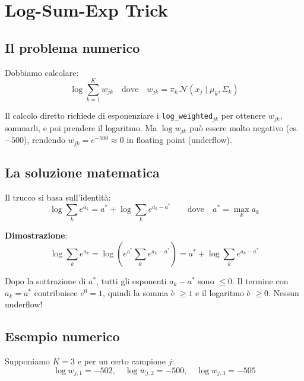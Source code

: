 \documentclass[11pt,a4paper]{article}
\begin{document}
\section{Log-Sum-Exp Trick}\label{sec:logsumexp}

\subsection{Il problema numerico}

Dobbiamo calcolare:
\[
  \log \sum_{k=1}^{K} w_{jk}
  \quad\text{dove}\quad
  w_{jk} = \pi_k \, \mathcal{N}(x_j \mid \mu_k, \Sigma_k)
\]

Il calcolo diretto richiede di esponenziare i
\texttt{log\_weighted}$_{jk}$ per ottenere $w_{jk}$, sommarli,
e poi prendere il logaritmo. Ma $\log w_{jk}$ può essere molto
negativo (es.\ $-500$), rendendo $w_{jk} = e^{-500} \approx 0$
in floating point (underflow).

\subsection{La soluzione matematica}

Il trucco si basa sull'identità:
\begin{equation}\label{eq:logsumexp}
  \log \sum_k e^{a_k} = a^* + \log \sum_k e^{a_k - a^*}
  \qquad\text{dove}\quad a^* = \max_k a_k
\end{equation}

\textbf{Dimostrazione}:
\[
  \log \sum_k e^{a_k} = \log\!\left(e^{a^*} \sum_k
  e^{a_k - a^*}\right) = a^* + \log \sum_k e^{a_k - a^*}
\]

\begin{tipbox}
Dopo la sottrazione di $a^*$, tutti gli esponenti $a_k - a^*$ sono
$\le 0$. Il termine con $a_k = a^*$ contribuisce $e^0 = 1$, quindi
la somma è $\ge 1$ e il logaritmo è $\ge 0$. Nessun underflow!
\end{tipbox}

\subsection{Esempio numerico}

Supponiamo $K=3$ e per un certo campione $j$:
\[
  \log w_{j,1} = -502, \quad
  \log w_{j,2} = -500, \quad
  \log w_{j,3} = -505
\]
\end{document}
